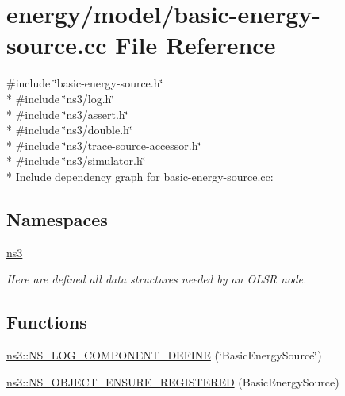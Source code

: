 \hypertarget{basic-energy-source_8cc}{}\section{energy/model/basic-\/energy-\/source.cc File Reference}
\label{basic-energy-source_8cc}
{\ttfamily \#include \char`\"{}basic-\/energy-\/source.\+h\char`\"{}}\\*
{\ttfamily \#include \char`\"{}ns3/log.\+h\char`\"{}}\\*
{\ttfamily \#include \char`\"{}ns3/assert.\+h\char`\"{}}\\*
{\ttfamily \#include \char`\"{}ns3/double.\+h\char`\"{}}\\*
{\ttfamily \#include \char`\"{}ns3/trace-\/source-\/accessor.\+h\char`\"{}}\\*
{\ttfamily \#include \char`\"{}ns3/simulator.\+h\char`\"{}}\\*
Include dependency graph for basic-\/energy-\/source.cc\+:
\subsection*{Namespaces}
\begin{DoxyCompactItemize}
\item 
 \hyperlink{namespacens3}{ns3}
\begin{DoxyCompactList}\small\item\em Here are defined all data structures needed by an O\+L\+SR node. \end{DoxyCompactList}\end{DoxyCompactItemize}
\subsection*{Functions}
\begin{DoxyCompactItemize}
\item 
\hyperlink{namespacens3_a255bd9509277de51a5f9510ae960b7a9}{ns3\+::\+N\+S\+\_\+\+L\+O\+G\+\_\+\+C\+O\+M\+P\+O\+N\+E\+N\+T\+\_\+\+D\+E\+F\+I\+NE} (\char`\"{}Basic\+Energy\+Source\char`\"{})
\item 
\hyperlink{namespacens3_a615231273b9b46d65e802b9f0eb24393}{ns3\+::\+N\+S\+\_\+\+O\+B\+J\+E\+C\+T\+\_\+\+E\+N\+S\+U\+R\+E\+\_\+\+R\+E\+G\+I\+S\+T\+E\+R\+ED} (Basic\+Energy\+Source)
\end{DoxyCompactItemize}
